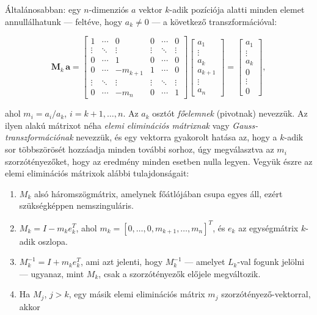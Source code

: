 \documentclass[
  magyar,
  11pt]{article}
\providecommand{\tightlist}{%
  \setlength{\itemsep}{0pt}\setlength{\parskip}{0pt}}
\providecommand{\boldsymbol}[1]{\mathbf{#1}}
\begin{document}
Általánosabban: egy \(n\)-dimenziós \(a\) vektor \(k\)-adik pozíciója
alatti minden elemet annullálhatunk --- feltéve, hogy \(a_k \neq 0\) ---
a következő transzformációval:

\[\boldsymbol{M}_{k}\,\boldsymbol{a} = \begin{bmatrix} 1 & \cdots & 0 & 0 & \cdots & 0 \\ \vdots & \ddots & \vdots & \vdots & \ddots & \vdots \\ 0 & \cdots & 1 & 0 & \cdots & 0 \\ 0 & \cdots & -m_{k+1} & 1 & \cdots & 0 \\ \vdots & \ddots & \vdots & \vdots & \ddots & \vdots \\ 0 & \cdots & -m_{n} & 0 & \cdots & 1 \end{bmatrix} \begin{bmatrix} a_{1} \\ \vdots \\ a_{k} \\ a_{k+1} \\ \vdots \\ a_{n} \end{bmatrix} = \begin{bmatrix} a_{1} \\ \vdots \\ a_{k} \\ 0 \\ \vdots \\ 0 \end{bmatrix},\]

ahol \(m_i = a_i/a_k\), \(i = k+1, \dots, n\). Az \(a_k\) osztót
\emph{főelemnek} (pivotnak) nevezzük. Az ilyen alakú mátrixot néha
\emph{elemi eliminációs mátrixnak} vagy \emph{Gauss-transzformációnak}
nevezzük, és egy vektorra gyakorolt hatása az, hogy a \(k\)-adik sor
többszörösét hozzáadja minden további sorhoz, úgy megválasztva az
\(m_i\) szorzótényezőket, hogy az eredmény minden esetben nulla legyen.
Vegyük észre az elemi eliminációs mátrixok alábbi tulajdonságait:

\begin{enumerate}
\def\labelenumi{\arabic{enumi}.}
\tightlist
\item
  \(M_k\) alsó háromszögmátrix, amelynek főátlójában csupa egyes áll,
  ezért szükségképpen nemszinguláris.
\item
  \(M_k = I - m_k e_k^T\), ahol
  \(m_k = [0, \dots, 0, m_{k+1}, \dots, m_n]^T\), és \(e_k\) az
  egységmátrix \(k\)-adik oszlopa.
\item
  \(M_k^{-1} = I + m_k e_k^T\), ami azt jelenti, hogy \(M_k^{-1}\) ---
  amelyet \(L_k\)-val fogunk jelölni --- ugyanaz, mint \(M_k\), csak a
  szorzótényezők előjele megváltozik.
\item
  Ha \(M_j\), \(j > k\), egy másik elemi eliminációs mátrix \(m_j\)
  szorzótényező-vektorral, akkor
\end{enumerate}
\end{document}
